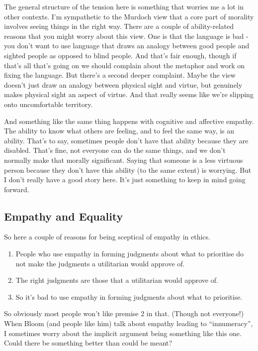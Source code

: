 \documentclass[
]{article}
\providecommand{\tightlist}{%
  \setlength{\itemsep}{0pt}\setlength{\parskip}{0pt}}
\begin{document}
The general structure of the tension here is something that worries me a
lot in other contexts. I'm sympathetic to the Murdoch view that a core
part of morality involves seeing things in the right way. There are a
couple of ability-related reasons that you might worry about this view.
One is that the language is bad - you don't want to use language that
draws an analogy between good people and sighted people as opposed to
blind people. And that's fair enough, though if that's all that's going
on we should complain about the metaphor and work on fixing the
language. But there's a second deeper complaint. Maybe the view doesn't
just draw an analogy between physical sight and virtue, but genuinely
makes physical sight an aspect of virtue. And that really seems like
we're slipping onto uncomfortable territory.

And something like the same thing happens with cognitive and affective
empathy. The ability to know what others are feeling, and to feel the
same way, is an ability. That's to say, sometimes people don't have that
ability because they are disabled. That's fine, not everyone can do the
same things, and we don't normally make that morally significant. Saying
that someone is a less virtuous person because they don't have this
ability (to the same extent) is worrying. But I don't really have a good
story here. It's just something to keep in mind going forward.

\hypertarget{empathy-and-equality}{%
\subsection{Empathy and Equality}\label{empathy-and-equality}}

So here a couple of reasons for being sceptical of empathy in ethics.

\begin{enumerate}
\def\labelenumi{\arabic{enumi}.}
\tightlist
\item
  People who use empathy in forming judgments about what to prioritise
  do not make the judgments a utilitarian would approve of.
\item
  The right judgments are those that a utilitarian would approve of.
\item
  So it's bad to use empathy in forming judgments about what to
  prioritise.
\end{enumerate}

So obviously most people won't like premise 2 in that. (Though not
everyone!) When Bloom (and people like him) talk about empathy leading
to ``innumeracy'', I sometimes worry about the implicit argument being
something like this one. Could there be something better than could be
meant?
\end{document}
